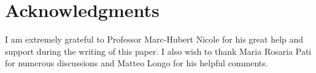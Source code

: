\documentclass[12pt,a4paper,reqno]{amsart}
\theoremstyle{definition}
\numberwithin{definition}{subsection}
\theoremstyle{definition}
\numberwithin{Definition}{subsection}
\theoremstyle{remark}
\theoremstyle{remark}
\numberwithin{Remark}{subsection}
\theoremstyle{remark}
\theoremstyle{plain}
\numberwithin{Theorem}{subsection}
\theoremstyle{plain}
\theoremstyle{plain}
\theoremstyle{plain}
\theoremstyle{plain}
\theoremstyle{plain}
\theoremstyle{plain}
\theoremstyle{plain}
\begin{document}
\section*{Acknowledgments}

I am extremely grateful to Professor Marc-Hubert Nicole for his great help and support during the writing of this paper. I also wish to thank Maria Rosaria Pati for numerous discussions and Matteo Longo for his helpful comments. %

\end{document}

